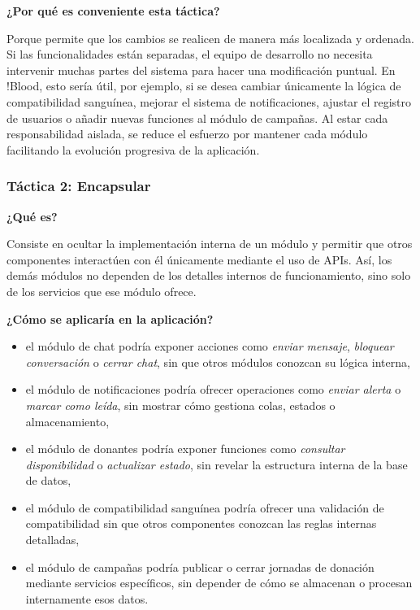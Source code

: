 \medskip
\noindent\textbf{¿Por qué es conveniente esta táctica?}

Porque permite que los cambios se realicen de manera más localizada y ordenada. Si las funcionalidades están separadas, el equipo de desarrollo no necesita intervenir muchas partes del sistema para hacer una modificación puntual. En !Blood, esto sería útil, por ejemplo, si se desea cambiar únicamente la lógica de compatibilidad sanguínea, mejorar el sistema de notificaciones, ajustar el registro de usuarios o añadir nuevas funciones al módulo de campañas. Al estar cada responsabilidad aislada, se reduce el esfuerzo por mantener cada módulo facilitando la evolución progresiva de la aplicación.

\subsubsection{Táctica 2: Encapsular}

\noindent\textbf{¿Qué es?}

Consiste en ocultar la implementación interna de un módulo y permitir que otros componentes interactúen con él únicamente mediante el uso de APIs. Así, los demás módulos no dependen de los detalles internos de funcionamiento, sino solo de los servicios que ese módulo ofrece.

\medskip
\noindent\textbf{¿Cómo se aplicaría en la aplicación?}

\begin{itemize}
    \item el módulo de chat podría exponer acciones como \textit{enviar mensaje}, \textit{bloquear conversación} o \textit{cerrar chat}, sin que otros módulos conozcan su lógica interna,
    \item el módulo de notificaciones podría ofrecer operaciones como \textit{enviar alerta} o \textit{marcar como leída}, sin mostrar cómo gestiona colas, estados o almacenamiento,
    \item el módulo de donantes podría exponer funciones como \textit{consultar disponibilidad} o \textit{actualizar estado}, sin revelar la estructura interna de la base de datos,
    \item el módulo de compatibilidad sanguínea podría ofrecer una validación de compatibilidad sin que otros componentes conozcan las reglas internas detalladas,
    \item el módulo de campañas podría publicar o cerrar jornadas de donación mediante servicios específicos, sin depender de cómo se almacenan o procesan internamente esos datos.
\end{itemize}

